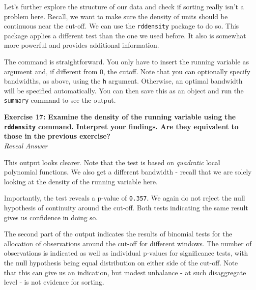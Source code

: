 \documentclass[
  letterpaper,
  DIV=11,
  numbers=noendperiod]{scrreprt}
\newenvironment{Shaded}{\begin{snugshade}}{\end{snugshade}}
\newcommand{\AttributeTok}[1]{\textcolor[rgb]{0.40,0.45,0.13}{#1}}
\newcommand{\DecValTok}[1]{\textcolor[rgb]{0.68,0.00,0.00}{#1}}
\newcommand{\FunctionTok}[1]{\textcolor[rgb]{0.28,0.35,0.67}{#1}}
\newcommand{\NormalTok}[1]{\textcolor[rgb]{0.00,0.23,0.31}{#1}}
\newcommand{\OtherTok}[1]{\textcolor[rgb]{0.00,0.23,0.31}{#1}}
\newcommand{\SpecialCharTok}[1]{\textcolor[rgb]{0.37,0.37,0.37}{#1}}
\begin{document}
\hfill\break

Let's further explore the structure of our data and check if sorting
really isn't a problem here. Recall, we want to make sure the density of
units should be continuous near the cut-off. We can use the
\texttt{rddensity} package to do so. This package applies a different
test than the one we used before. It also is somewhat more powerful and
provides additional information.

The command is straightforward. You only have to insert the running
variable as argument and, if different from 0, the cutoff. Note that you
can optionally specify bandwidths, as above, using the \texttt{h}
argument. Otherwise, an optimal bandwidth will be specified
automatically. You can then save this as an object and run the
\texttt{summary} command to see the output.

\textbf{Exercise 17: Examine the density of the running variable using
the \texttt{rddensity} command. Interpret your findings. Are they
equivalent to those in the previous exercise?}\\

\emph{Reveal Answer}

\begin{Shaded}
\end{Shaded}

This output looks clearer. Note that the test is based on
\emph{quadratic} local polynomial functions. We also get a different
bandwidth - recall that we are solely looking at the density of the
running variable here.

Importantly, the test reveals a p-value of \texttt{0.357}. We again do
not reject the null hypothesis of continuity around the cut-off. Both
tests indicating the same result gives us confidence in doing so.

The second part of the output indicates the results of binomial tests
for the allocation of observations around the cut-off for different
windows. The number of observations is indicated as well as individual
p-values for significance tests, with the null hypothesis being equal
distribution on either side of the cut-off. Note that this can give us
an indication, but modest unbalance - at such disaggregate level - is
not evidence for sorting.
\end{document}

